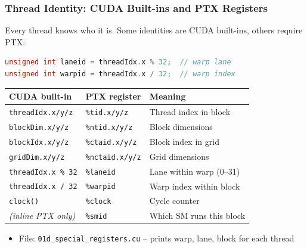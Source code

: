 \documentclass[aspectratio=169]{beamer}
\begin{document}
\begin{frame}[fragile]
	\frametitle{Thread Identity: CUDA Built-ins and PTX Registers}
	Every thread knows who it is. Some identities are CUDA built-ins, others require PTX:
	\vspace{0.3em}
	\begin{lstlisting}[language=C, title={\color{codegreen}Works on LeetGPU}]
unsigned int laneid = threadIdx.x % 32;  // warp lane
unsigned int warpid = threadIdx.x / 32;  // warp index
	\end{lstlisting}
	\vspace{0.2em}
	\renewcommand{\arraystretch}{1.2}
	\begin{center}\scriptsize
		\begin{tabular}{l l l}
			\toprule
			\textcolor{codegreen}{CUDA built-in}                & \textcolor{codegreen}{PTX register}     & \textcolor{codegreen}{Meaning} \\
			\midrule
			\texttt{threadIdx.x/y/z}  & \texttt{\%tid.x/y/z}    & Thread index in block \\
			\texttt{blockDim.x/y/z}   & \texttt{\%ntid.x/y/z}   & Block dimensions \\
			\texttt{blockIdx.x/y/z}   & \texttt{\%ctaid.x/y/z}  & Block index in grid \\
			\texttt{gridDim.x/y/z}    & \texttt{\%nctaid.x/y/z} & Grid dimensions \\
			\texttt{threadIdx.x \% 32}& \texttt{\%laneid}        & Lane within warp (0--31) \\
			\texttt{threadIdx.x / 32} & \texttt{\%warpid}        & Warp index within block \\
			\texttt{clock()}           & \texttt{\%clock}         & Cycle counter \\
			\textit{(inline PTX only)} & \texttt{\%smid}          & Which SM runs this block \\
			\bottomrule
		\end{tabular}
	\end{center}
	\vspace{0.2em}
	\begin{itemize}
		\item File: \texttt{01d\_special\_registers.cu} -- prints warp, lane, block for each thread
	\end{itemize}
\end{frame}
\end{document}
